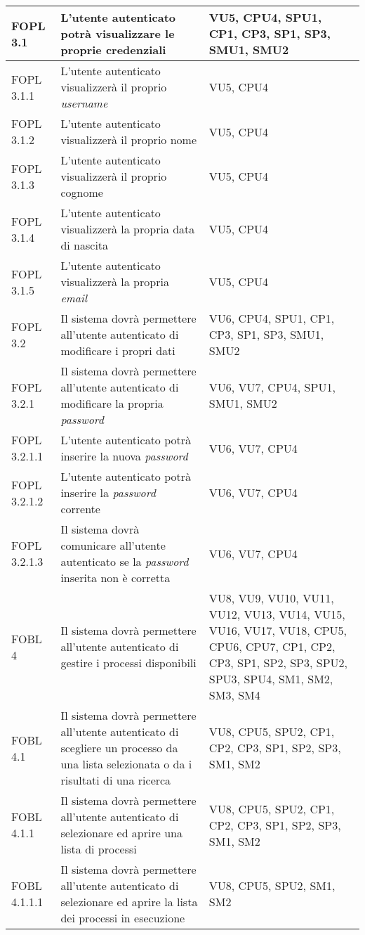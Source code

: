 \begin{longtable}{lXp{}}
FOPL 3.1&L'utente autenticato potrà visualizzare le proprie credenziali&VU5, CPU4, SPU1, CP1, CP3, SP1, SP3, SMU1, SMU2\\
\midrule
FOPL 3.1.1&L'utente autenticato visualizzerà il proprio \textit{username}&VU5, CPU4\\
\midrule
FOPL 3.1.2&L'utente autenticato visualizzerà il proprio nome&VU5, CPU4\\
\midrule
FOPL 3.1.3&L'utente autenticato visualizzerà il proprio cognome&VU5,  CPU4\\
\midrule
FOPL 3.1.4&L'utente autenticato visualizzerà la propria data di nascita&VU5, CPU4\\
\midrule
FOPL 3.1.5&L'utente autenticato visualizzerà la propria \textit{email}&VU5, CPU4\\
\midrule
FOPL 3.2&Il sistema dovrà permettere all'utente autenticato di modificare i propri dati&VU6, CPU4, SPU1, CP1, CP3, SP1, SP3, SMU1, SMU2\\
\midrule
FOPL 3.2.1&Il sistema dovrà permettere all'utente autenticato di modificare la propria \textit{password}&VU6, VU7, CPU4, SPU1, SMU1, SMU2\\
\midrule
FOPL 3.2.1.1&L'utente autenticato potrà inserire la nuova \textit{password}&VU6, VU7, CPU4\\
\midrule
FOPL 3.2.1.2&L'utente autenticato potrà inserire la \textit{password} corrente&VU6, VU7, CPU4\\
\midrule
FOPL 3.2.1.3&Il sistema dovrà comunicare all'utente autenticato se la \textit{password} inserita non è corretta&VU6, VU7, CPU4\\
\midrule
FOBL 4&Il sistema dovrà permettere all'utente autenticato di gestire i processi disponibili&VU8, VU9, VU10, VU11, VU12, VU13, VU14, VU15, VU16, VU17, VU18, CPU5, CPU6, CPU7, CP1, CP2, CP3, SP1, SP2, SP3, SPU2, SPU3, SPU4, SM1, SM2, SM3, SM4\\
\midrule
FOBL 4.1&Il sistema dovrà permettere all'utente autenticato di scegliere un processo da una lista selezionata o da i risultati di una ricerca&VU8, CPU5, SPU2, CP1, CP2, CP3, SP1, SP2, SP3, SM1, SM2\\
\midrule
FOBL 4.1.1&Il sistema dovrà permettere all'utente autenticato di selezionare ed aprire una lista di processi&VU8, CPU5, SPU2, CP1, CP2, CP3, SP1, SP2, SP3, SM1, SM2\\
\midrule
FOBL 4.1.1.1&Il sistema dovrà permettere all'utente autenticato di selezionare ed aprire la lista dei processi in esecuzione&VU8, CPU5, SPU2, SM1, SM2\\

\end{longtable}
